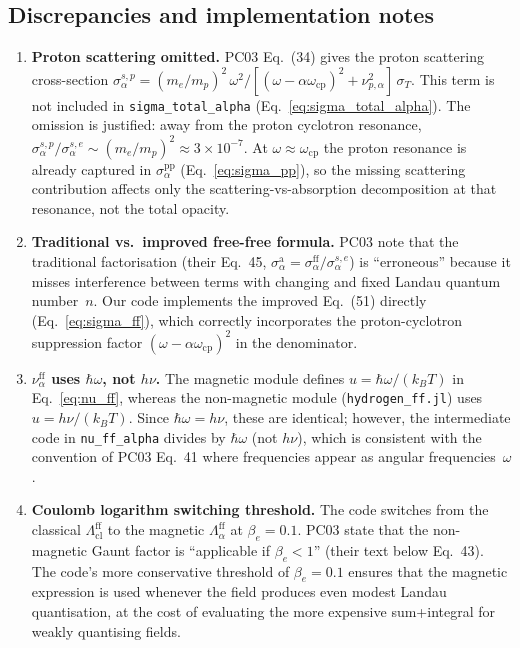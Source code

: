 \subsection{Discrepancies and implementation notes}
\label{sec:opacity:discrepancies}

\begin{enumerate}

\item \textbf{Proton scattering omitted.}
  PC03 Eq.~(34) gives the proton scattering cross-section
  $\sigma_\alpha^{s,p} = (m_e/m_p)^2\,
  \omega^2/[(\omega-\alpha\omega_{\mathrm{cp}})^2 + \nu_{p,\alpha}^2]
  \,\sigma_T$.
  This term is not included in \texttt{sigma\_total\_alpha}
  (Eq.~\ref{eq:sigma_total_alpha}).
  The omission is justified: away from the proton cyclotron resonance,
  $\sigma_\alpha^{s,p}/\sigma_\alpha^{s,e} \sim (m_e/m_p)^2
  \approx 3\times10^{-7}$.
  At $\omega \approx \omega_{\mathrm{cp}}$ the proton resonance
  is already captured in $\sigma_\alpha^{\mathrm{pp}}$
  (Eq.~\ref{eq:sigma_pp}), so the missing scattering contribution
  affects only the scattering-vs-absorption decomposition at that
  resonance, not the total opacity.

\item \textbf{Traditional vs.\ improved free-free formula.}
  PC03 note that the traditional factorisation (their Eq.~45,
  $\sigma_\alpha^{\mathrm{a}} = \sigma_\alpha^{\mathrm{ff}} /
  \sigma_\alpha^{s,e}$) is ``erroneous'' because it misses
  interference between terms with changing and fixed Landau quantum
  number~$n$.
  Our code implements the improved Eq.~(51) directly
  (Eq.~\ref{eq:sigma_ff}), which correctly incorporates the
  proton-cyclotron suppression factor $(\omega-\alpha\omega_{\mathrm{cp}})^2$
  in the denominator.

\item \textbf{$\nu_\alpha^{\mathrm{ff}}$ uses $\hbar\omega$, not $h\nu$.}
  The magnetic module defines $u = \hbar\omega/(k_B T)$ in
  Eq.~\eqref{eq:nu_ff}, whereas the non-magnetic module
  (\texttt{hydrogen\_ff.jl}) uses $u = h\nu/(k_B T)$.
  Since $\hbar\omega = h\nu$, these are identical; however, the
  intermediate code in \texttt{nu\_ff\_alpha} divides by $\hbar\omega$
  (not $h\nu$), which is consistent with the convention of PC03 Eq.~41
  where frequencies appear as angular frequencies~$\omega$.

\item \textbf{Coulomb logarithm switching threshold.}
  The code switches from the classical $\Lambda_{\mathrm{cl}}^{\mathrm{ff}}$
  to the magnetic $\Lambda_\alpha^{\mathrm{ff}}$ at $\beta_e = 0.1$.
  PC03 state that the non-magnetic Gaunt factor is ``applicable if
  $\beta_e < 1$'' (their text below Eq.~43).  The code's more conservative
  threshold of $\beta_e = 0.1$ ensures that the magnetic expression is
  used whenever the field produces even modest Landau quantisation, at
  the cost of evaluating the more expensive sum+integral for weakly
  quantising fields.


\end{enumerate}
